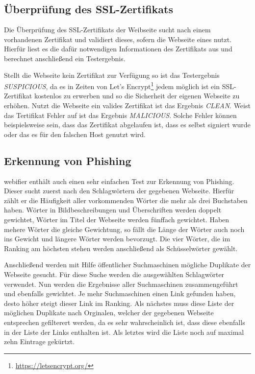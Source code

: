 \subsection{Überprüfung des SSL-Zertifikats}

Die Überprüfung des SSL-Zertifikats der Weibseite sucht nach einem vorhandenen Zertifikat und validiert dieses, sofern die Webseite eines nutzt. Hierfür liest es die dafür notwendigen Informationen des  Zertifikats aus und berechnet anschließend ein Testergebnis.

Stellt die Webseite kein Zertifikat zur Verfügung so ist das Testergebnis \textit{SUSPICIOUS}, da es in Zeiten von Let's Encrypt\footnote{\url{https://letsencrypt.org/}} jedem möglich ist ein SSL-Zertifikat kostenlos zu erwerben und so die Sicherheit der eigenen Webseite zu erhöhen. Nutzt die Webseite ein valides Zertifikat ist das Ergebnis \textit{CLEAN}. Weist das Tertifikat Fehler auf ist das Ergebnis \textit{MALICIOUS}. Solche Fehler können beispielsweise sein, dass das Zertifikat abgelaufen ist, dass es selbst signiert wurde oder das es für den falschen Host genutzt wird.

\subsection{Erkennung von Phishing}

webifier enthält auch einen sehr einfachen Test zur Erkennung von Phishing. Dieser sucht zuerst nach den Schlagwörtern der gegebenen Webseite. Hierfür zählt er die Häufigkeit aller vorkommenden Wörter die mehr als drei Buchstaben haben. Wörter in Bildbeschreibungen und Überschriften werden doppelt gewichtet, Wörter im Titel der Webseite werden fünffach gewichtet. Haben mehere Wörter die gleiche Gewichtung, so fällt die Länge der Wörter auch noch ins Gewicht und längere Wörter werden bevorzugt. Die vier Wörter, die im Ranking am höchsten stehen werden anschließend als Schüsselwörter gewählt.

Anschließend werden mit Hilfe öffentlicher Suchmaschinen mögliche Duplikate der Webseite gesucht. Für diese Suche werden die ausgewählten Schlagwörter verwendet. Nun werden die Ergebnisse aller Suchmaschinen zusammengeführt und ebenfalls gewichtet. Je mehr Suchmaschinen einen Link gefunden haben, desto höher steigt dieser Link im Ranking. Als nächstes muss diese Liste der möglichen Duplikate nach Orginalen, welcher der gegebenen Webseite entsprechen gefilterert werden, da es sehr wahrscheinlich ist, dass diese ebenfalls in der Liste der Links enthalten ist. Als letztes wird die Liste noch auf maximal zehn Eintrage gekürtzt.

